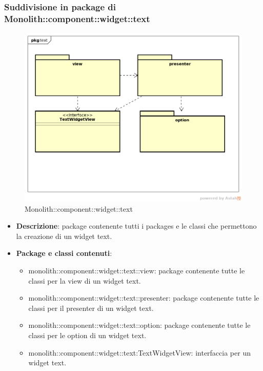 \subsubsection{Suddivisione in package  di Monolith::component::widget::text}
\label{Monolith::component::widget::text}
\begin{figure}[H]
	\centering
	\includegraphics[scale=0.5]{Sezioni/imgPackage/component_widget_text.png}
	\caption{Monolith::component::widget::text}
\end{figure}
\begin{itemize}
	\item{\textbf{Descrizione}}: package contenente tutti i packages e le classi che permettono la creazione di un widget text.
	\item{\textbf{Package e classi contenuti}}:
	\begin{itemize}
	\item{monolith::component::widget::text::view}: package contenente tutte le classi per la view di un widget text.
	\item{monolith::component::widget::text::presenter}: package contenente tutte le classi per il presenter di un widget text.
	\item{monolith::component::widget::text::option}: package contenente tutte le classi per le option di un widget text.
	\item{monolith::component::widget::text:TextWidgetView}: interfaccia per un widget text.
	\end{itemize}

\end{itemize}


